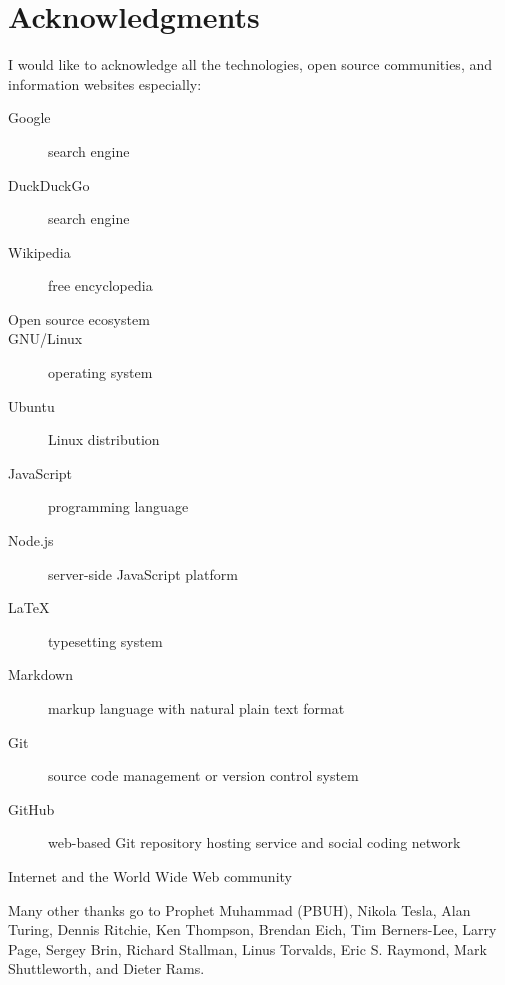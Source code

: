 
\begingroup
\let\clearpage\relax
\let\cleardoublepage\relax
\let\cleardoublepage\relax

\chapter*{Acknowledgments}

I would like to acknowledge all the technologies, open source communities, and information websites especially:

\begin{description}
  \item[Google] search engine
  \item[DuckDuckGo] search engine
  \item[Wikipedia] free encyclopedia
  \item[Open source ecosystem]
  \item[GNU/Linux] operating system
  \item[Ubuntu] Linux distribution
  \item[JavaScript] programming language
  \item[Node.js] server-side JavaScript platform
  \item[LaTeX] typesetting system
  \item[Markdown] markup language with natural plain text format
  \item[Git] source code management or version control system
  \item[GitHub] web-based Git repository hosting service and social coding network
  \item[Internet and the World Wide Web community]
\end{description}

Many other thanks go to Prophet Muhammad (PBUH), Nikola Tesla, Alan Turing, Dennis Ritchie, Ken Thompson, Brendan Eich, Tim Berners-Lee, Larry Page, Sergey Brin, Richard Stallman, Linus Torvalds, Eric S. Raymond, Mark Shuttleworth, and Dieter Rams.

\endgroup
